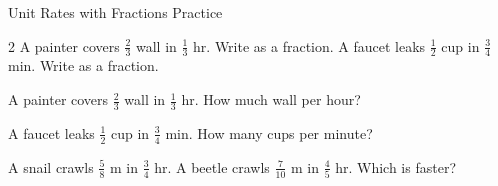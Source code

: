 
\newpage
\begin{stepPractice}{Unit Rates with Fractions Practice}
    \resetProblems

    \begin{multicols}{2}
    \prob A painter covers $\frac{2}{3}$ wall in $\frac{1}{3}$ hr. Write as a fraction. \answerBlank[2.5cm]
    \prob A faucet leaks $\frac{1}{2}$ cup in $\frac{3}{4}$ min. Write as a fraction. \answerBlank[2.5cm]
    \end{multicols}

    \prob A painter covers $\frac{2}{3}$ wall in $\frac{1}{3}$ hr. How much wall per hour? \answerBlank[2.5cm]

    \prob A faucet leaks $\frac{1}{2}$ cup in $\frac{3}{4}$ min. How many cups per minute? \answerBlank[2.5cm]

    \prob A snail crawls $\frac{5}{8}$ m in $\frac{3}{4}$ hr. A beetle crawls $\frac{7}{10}$ m in $\frac{4}{5}$ hr. Which is faster? \answerBlank[2cm]

\end{stepPractice}

